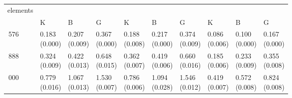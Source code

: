 \begin{table}[H]\centering\begin{tabular}{>{\centering\arraybackslash}m{1.2cm}|>{\centering\arraybackslash}m{1.25cm}>{\centering\arraybackslash}m{1.25cm}>{\centering\arraybackslash}m{1.25cm}|>{\centering\arraybackslash}m{1.25cm}>{\centering\arraybackslash}m{1.25cm}>{\centering\arraybackslash}m{1.25cm}|>{\centering\arraybackslash}m{1.25cm}>{\centering\arraybackslash}m{1.25cm}>{\centering\arraybackslash}m{1.25cm}}
\toprule
elements & \multicolumn{3}{|c}{gravity} & \multicolumn{3}{|c}{traction} & \multicolumn{3}{|c}{compression} \\
 & K & B & G & K & B & G & K & B & G \\
\midrule
24\,576 & \makecell{0.183\\[-4pt](0.000)} & \makecell{0.207\\[-4pt](0.009)} & \makecell{0.367\\[-4pt](0.000)} & \makecell{0.188\\[-4pt](0.008)} & \makecell{0.217\\[-4pt](0.000)} & \makecell{0.374\\[-4pt](0.009)} & \makecell{0.086\\[-4pt](0.006)} & \makecell{0.100\\[-4pt](0.000)} & \makecell{0.167\\[-4pt](0.000)} \\
63\,888 & \makecell{0.324\\[-4pt](0.009)} & \makecell{0.422\\[-4pt](0.013)} & \makecell{0.648\\[-4pt](0.015)} & \makecell{0.362\\[-4pt](0.007)} & \makecell{0.419\\[-4pt](0.006)} & \makecell{0.660\\[-4pt](0.016)} & \makecell{0.185\\[-4pt](0.006)} & \makecell{0.233\\[-4pt](0.009)} & \makecell{0.355\\[-4pt](0.008)} \\
162\,000 & \makecell{0.779\\[-4pt](0.016)} & \makecell{1.067\\[-4pt](0.013)} & \makecell{1.530\\[-4pt](0.007)} & \makecell{0.786\\[-4pt](0.006)} & \makecell{1.094\\[-4pt](0.028)} & \makecell{1.546\\[-4pt](0.012)} & \makecell{0.419\\[-4pt](0.007)} & \makecell{0.572\\[-4pt](0.008)} & \makecell{0.824\\[-4pt](0.008)} \\

\end{tabular}
\end{table}
